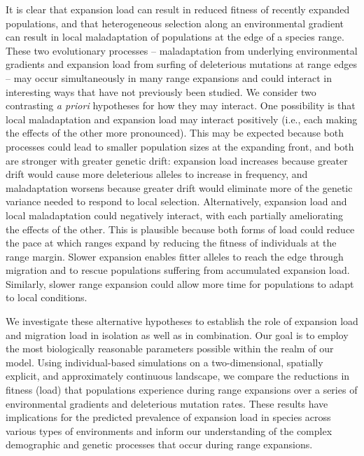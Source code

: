 It is clear that expansion load can result in reduced fitness of recently expanded populations, and that heterogeneous selection along an environmental gradient can result in local maladaptation of populations at the edge of a species range. These two evolutionary processes -- maladaptation from underlying environmental gradients and expansion load from surfing of deleterious mutations at range edges -- may occur simultaneously in many range expansions and could interact in interesting ways that have not previously been studied. We consider two contrasting \emph{a priori} hypotheses for how they may interact. One possibility is that local maladaptation and expansion load may interact positively (i.e., each making the effects of the other more pronounced). This may be expected because both processes could lead to smaller population sizes at the expanding front, and both are stronger with greater genetic drift: expansion load increases because greater drift would cause more deleterious alleles to increase in frequency, and maladaptation worsens because greater drift would eliminate more of the genetic variance needed to respond to local selection. Alternatively, expansion load and local maladaptation could negatively interact, with each partially ameliorating the effects of the other. This is plausible because both forms of load could reduce the pace at which ranges expand by reducing the fitness of individuals at the range margin. Slower expansion enables fitter alleles to reach the edge through migration and to rescue populations suffering from accumulated expansion load. Similarly, slower range expansion could allow more time for populations to adapt to local conditions.

We investigate these alternative hypotheses to establish the role of expansion load and migration load in isolation as well as in combination. Our goal is to employ the most biologically reasonable parameters possible within the realm of our model. Using individual-based simulations on a two-dimensional, spatially explicit, and approximately continuous landscape, we compare the reductions in fitness (load) that populations experience during range expansions over a series of environmental gradients and deleterious mutation rates. These results have implications for the predicted prevalence of expansion load in species across various types of environments and inform our understanding of the complex demographic and genetic processes that occur during range expansions. 

